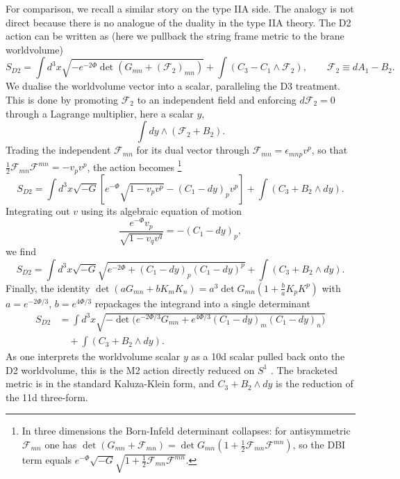 For comparison, we recall a similar story on the type IIA side.
The analogy is not direct because there is no analogue of the \SLZ{} duality in the type IIA theory.
The D2 action can be written as (here we pullback the string frame metric to the brane worldvolume) \cite{Schmidhuber:1996fy,Tseytlin:1996it}
\begin{equation}
S_{D2}
=\int d^3x \sqrt{-e^{-2\Phi}\det (G_{mn}+(\mathcal F_2)_{mn})}
+\int\left(C_3-C_1\wedge\mathcal F_2\right),\qquad
\mathcal F_2\equiv dA_1-B_2.
\end{equation}
We dualise the worldvolume vector into a scalar, paralleling the D3 treatment.
This is done by promoting $\mathcal F_2$ to an independent field and enforcing $d\mathcal F_2 = 0$ through a Lagrange multiplier, here a scalar $y$,
\begin{equation}
\int dy\wedge(\mathcal F_2 + B_2).
\end{equation}
Trading the independent $\mathcal F_{mn}$ for its dual vector through $\mathcal F_{mn}=\epsilon_{mnp}v^p$, so that $\tfrac12\mathcal F_{mn}\mathcal F^{mn}=-v_pv^p$, the action becomes%
\footnote{In three dimensions the Born-Infeld determinant collapses: for antisymmetric $\mathcal F_{mn}$ one has $\det(G_{mn}+\mathcal F_{mn})=\det G_{mn}(1+\tfrac12\mathcal F_{mn}\mathcal F^{mn})$, so the DBI term equals $e^{-\Phi}\sqrt{-G}\sqrt{1+\tfrac12\mathcal F_{mn}\mathcal F^{mn}}$.}
\begin{equation}
S_{D2}=\int d^3x\sqrt{-G}\left[e^{-\Phi}\sqrt{1-v_pv^p}-(C_1-dy)_pv^p\right]+\int\left(C_3 + B_2\wedge dy\right).
\end{equation}
Integrating out $v$ using its algebraic equation of motion
\begin{equation}
\frac{e^{-\Phi}v_p}{\sqrt{1-v_qv^q}}=-(C_1-dy)_p,
\label{D2-integrating-out-v}
\end{equation}
we find
\begin{equation}
S_{D2}=\int d^3x\sqrt{-G}\sqrt{e^{-2\Phi}+(C_1-dy)_p(C_1-dy)^p}+\int\left(C_3 + B_2\wedge dy\right).
\end{equation}
Finally, the identity $\det(aG_{mn}+bK_mK_n)=a^3\det G_{mn}(1+\tfrac{b}{a}K_pK^p)$ with $a=e^{-2\Phi/3}$, $b=e^{4\Phi/3}$ repackages the integrand into a single determinant
\begin{equation}
\begin{aligned}
S_{D2}
&=\int d^3x\sqrt{-\det\big(e^{-2\Phi/3}G_{mn} + e^{4\Phi/3}(C_1-dy)_m(C_1-dy)_n\big)}\\
&\quad+ \int\left(C_3 + B_2\wedge dy\right).
\end{aligned}
\end{equation}
As one interprets the worldvolume scalar $y$ as a 10d scalar pulled back onto the D2 worldvolume, this is the M2 action directly reduced on $S^1$ \cite{Bergshoeff:1987cm,Tseytlin:1996it,Schmidhuber:1996fy}. The bracketed metric is in the standard Kaluza-Klein form, and $C_3+B_2\wedge dy$ is the reduction of the 11d three-form.

